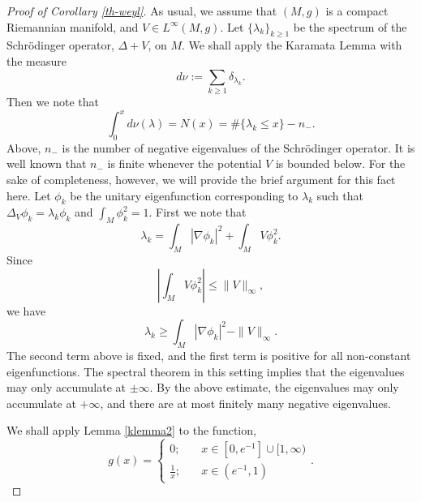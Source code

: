 \documentclass[letterpaper,12pt]{amsart}
\begin{document}

\begin{proof}[Proof of Corollary \ref{th-weyl}]
As usual, we assume that $(M,g)$ is a compact Riemannian manifold, and $V \in L^\infty(M,g)$.
Let $\{ \lambda_k \}_{k \geq 1}$ be the spectrum of the Schr\"odinger operator, $\Delta + V$, on $M$.   We shall apply the Karamata Lemma with the measure
$$d\nu := \sum_{k \geq 1} \delta_{\lambda_k}.$$
Then we note that
$$\int_0 ^x d\nu(\lambda) = N(x) = \# \{ \lambda_k \leq x \} - n_-.$$
Above, $n_-$ is the number of negative eigenvalues of the Schr\"odinger operator.  It is well known that $n_-$ is finite whenever the potential $V$ is bounded below. For the sake of completeness, however, we will provide the brief argument for this fact here. Let $\phi_k$ be the unitary eigenfunction corresponding to $\lambda_k$ such that $\Delta_V \phi_k = \lambda_k \phi_k$ and $\int_M \phi_k ^2 =1$. First we note that %
\[
\lambda_k = \int_M |\nabla \phi_k|^2 + \int_M V \phi_k^2. %
\]
Since
$$\left| \int_M V \phi_k^2 \right| \leq \|V\|_\infty,$$
we have
$$\lambda_k \geq \int_M |\nabla \phi_k|^2 - \|V\|_\infty.$$
The second term above is fixed, and the first term is positive for all non-constant eigenfunctions.  The spectral theorem in this setting implies that the eigenvalues may only accumulate at $\pm \infty$.   By the above estimate, the eigenvalues may only accumulate at $+ \infty$, and there are at most finitely many negative eigenvalues.



We shall apply Lemma \ref{klemma2} to the function,
\begin{equation} \label{cleverf}
g(x) = \left\{ \begin{array}{ll} 0;&\quad x\in\left[0,e^{-1}\right]\cup [1,\infty) \\ \frac{1}{x};&\quad x\in \left(e^{-1},1\right)\end{array} \right..
\end{equation}


\end{proof}
\end{document}
